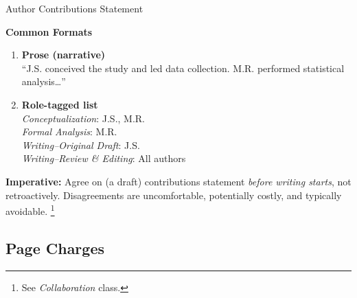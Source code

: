 \documentclass{beamer}
\begin{document}
\begin{frame}{Author Contributions Statement}

      \textbf{Common Formats}
      \medskip
      \begin{enumerate}
        \item \textbf{Prose (narrative)}\\
          \small ``J.S. conceived the study and led data collection.
          M.R. performed statistical analysis\ldots''

        \bigskip

        \item \textbf{Role-tagged list}\\
          \small \textit{Conceptualization}: J.S., M.R.\\
          \textit{Formal Analysis}: M.R.\\
          \textit{Writing--Original Draft}: J.S.\\
          \textit{Writing--Review \& Editing}: All authors
      \end{enumerate}

      \bigskip

      \alert{\textbf{Imperative:}} Agree on (a draft) contributions statement \emph{before writing starts}, not retroactively. 
      Disagreements are uncomfortable, potentially costly, and typically avoidable.%
      \footnote{See \emph{Collaboration} class.}

\end{frame}

\subsection{Page Charges}
\end{document}

